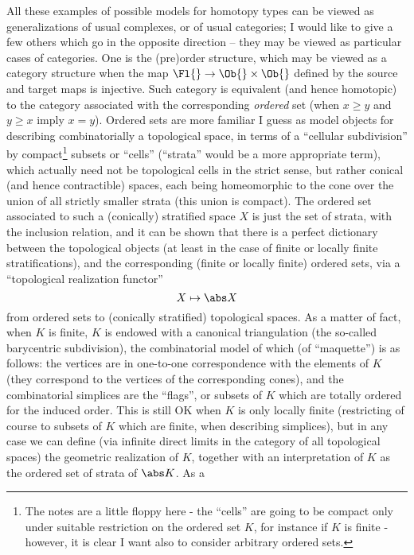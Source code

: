 \label{sec:22}%
All these examples of possible models for homotopy types can be viewed as
generalizations of usual complexes, or of usual categories; I would
like to give a few others which go in the opposite direction -- they
may be viewed as particular cases of categories. One is the (pre)order
structure, which may be viewed as a category structure when the map
$\Fl{} \to \Ob{} \times \Ob{}$ defined by the source and target maps
is injective. Such category is equivalent (and hence homotopic) to the
category associated with the corresponding \emph{ordered} set (when
$x\ge y$ and $y\ge x$ imply $x=y$). Ordered sets are more familiar I
guess as model objects for describing combinatorially a topological
space, in terms of a ``cellular subdivision'' by compact\footnote{The notes are a little floppy here - the ``cells'' are going to be compact only under suitable restriction on the ordered set $K$, for instance if $K$ is finite - however, it is clear I want also to consider arbitrary ordered sets.} subsets or
``cells'' (``strata'' would be a more appropriate term),
which actually need not be topological cells in the strict sense, but
rather conical (and hence contractible) spaces, each being
homeomorphic to the cone over the union of all strictly smaller strata
(this union is compact). The ordered set associated to such a
(conically) stratified space $X$ is just the set of strata, with the
inclusion relation, and it can be shown that there is a perfect
dictionary between the topological objects (at least in the case of
finite or locally finite stratifications), and the corresponding
(finite or locally finite) ordered sets, via a ``topological
realization functor''
\[ X \mapsto \abs X\]
from ordered sets to (conically stratified) topological spaces. As a
matter of fact, when $K$ is finite, $K$ is endowed with a canonical
triangulation (the so-called barycentric subdivision), the
combinatorial model of which (of ``maquette'') is as follows: the
vertices are in one-to-one correspondence with the elements of $K$
(they correspond to the vertices of the corresponding cones), and the
combinatorial simplices are the ``flags'', or subsets of $K$ which are
totally ordered for the induced order. This is still OK when $K$ is
only locally finite (restricting of course to subsets of $K$ which are
finite, when describing simplices), but in any case we can define (via
infinite direct limits in the category \Spaces of all topological
spaces) the geometric realization of $K$, together with an
interpretation of $K$ as the ordered set of strata of $\abs K$. As a

